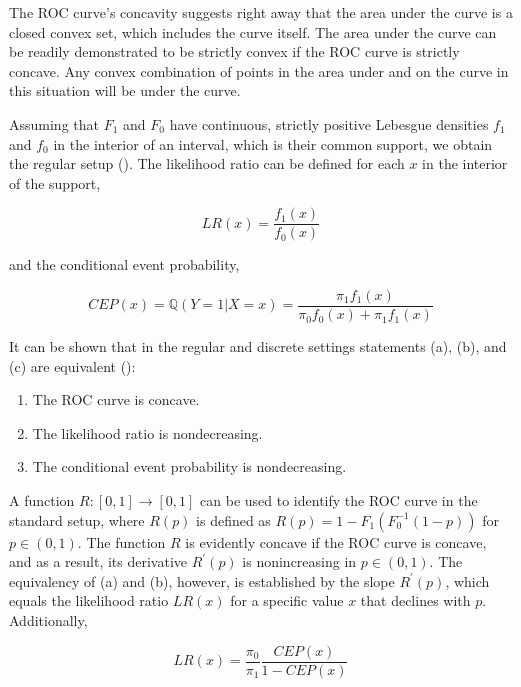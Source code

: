 \documentclass[a4paper,12pt]{article}
\numberwithin{equation}{section}
\begin{document}
   The ROC curve's concavity suggests right away that the area under the curve is a closed convex set, which includes the curve itself. The area under the curve can be readily demonstrated to be strictly convex if the ROC curve is strictly concave. Any convex combination of points in the area under and on the curve in this situation will be under the curve.\bigskip

   Assuming that $F_{1}$ and $F_{0}$ have continuous, strictly positive Lebesgue densities $f_{1}$ and $f_{0}$ in the interior of an interval, which is their common support, we obtain the regular setup (\cite{roc2}).\bigskip
   \newpage
   The likelihood ratio can be defined for each $x$ in the interior of the support,

   \begin{equation} \label{e:likelihood} 
   LR(x) = \frac{f_{1}(x)}{f_{0}(x)} 
   \end{equation} 

   and the conditional event probability,

   \begin{equation} \label{e:conditional} 
   CEP(x) = \mathbb{Q}(Y=1 | X=x) = \frac{\pi_{1}f_{1}(x)}{\pi_{0}f_{0}(x) + \pi_{1}f_{1}(x)}
   \end{equation}

   It can be shown that in  the regular and discrete settings statements (a), (b), and (c) are equivalent (\cite{roc2}):

   \begin{enumerate}[label=(\alph*)]

   \item The ROC curve is concave.
   \item The likelihood ratio is nondecreasing.
   \item The conditional event probability is nondecreasing.
   \end{enumerate}
   
   A function $R: [0, 1] \rightarrow  [0, 1]$ can be used to identify the ROC curve in the standard setup, where $R(p)$ is defined as $R(p) = 1 - F_{1}(F_{0}^{-1}(1-p))$ for $p \in (0, 1)$. The function $R$ is evidently concave if the ROC curve is concave, and as a result, its derivative $R^{'}(p)$ is nonincreasing in $p \in (0, 1)$. The equivalency of (a) and (b), however, is established by the slope $R^{'}(p)$, which equals the likelihood ratio $LR(x)$ for a specific value $x$ that declines with $p$. Additionally,

   \begin{equation} \label{e:likelihood_ratio} 
   LR(x) = \frac{\pi_{0}}{\pi_{1}} \frac{CEP(x)}{1-CEP(x)}
   \end{equation}
\end{document}
